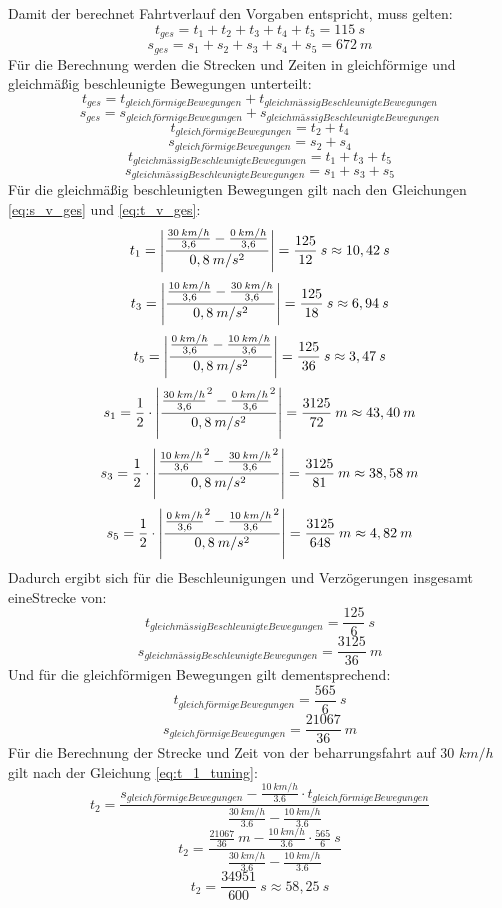 \noindent Damit der berechnet Fahrtverlauf den Vorgaben entspricht, muss gelten:
\[t_{ges} = t_1 + t_2 + t_3 + t_4 + t_5 = 115\:s\]
\[s_{ges} = s_1 + s_2 + s_3 + s_4 + s_5 = 672\:m\]
Für die Berechnung werden die Strecken und Zeiten in gleichförmige und gleichmäßig beschleunigte Bewegungen unterteilt:
\[t_{ges} = t_{gleichförmige Bewegungen} + t_{gleichmässig Beschleunigte Bewegungen}\]
\[s_{ges} = s_{gleichförmige Bewegungen} + s_{gleichmässig Beschleunigte Bewegungen}\]
\[t_{gleichförmige Bewegungen} = t_2 + t_4\]
\[s_{gleichförmige Bewegungen} = s_2 + s_4\]
\[t_{gleichmässig Beschleunigte Bewegungen} = t_1 + t_3 + t_5\]
\[s_{gleichmässig Beschleunigte Bewegungen} = s_1 + s_3 + s_5\]
Für die gleichmäßig beschleunigten Bewegungen gilt nach den Gleichungen \ref{eq:s_v_ges} und \ref{eq:t_v_ges}:
\[t_1 = \left\vert\frac{\frac{30\:km/h}{3,6}-\frac{0\:km/h}{3,6}}{0,8\:m/s^{2}}\right\vert = \frac{125}{12}\:s \approx 10,42\:s\]
\[t_3 = \left\vert\frac{\frac{10\:km/h}{3,6}-\frac{30\:km/h}{3,6}}{0,8\:m/s^{2}}\right\vert = \frac{125}{18}\:s \approx 6,94\:s\]
\[t_5 = \left\vert\frac{\frac{0\:km/h}{3,6}-\frac{10\:km/h}{3,6}}{0,8\:m/s^{2}}\right\vert = \frac{125}{36}\:s \approx 3,47\:s\]
\[s_1 = \frac{1}{2}\cdot\left\vert\frac{{\frac{30\:km/h}{3,6}}^2-{\frac{0\:km/h}{3,6}}^2}{0,8\:m/s^{2}}\right\vert = \frac{3125}{72}\:m \approx 43,40\:m\]
\[s_3 = \frac{1}{2}\cdot\left\vert\frac{{\frac{10\:km/h}{3,6}}^2-{\frac{30\:km/h}{3,6}}^2}{0,8\:m/s^{2}}\right\vert = \frac{3125}{81}\:m \approx 38,58\:m\]
\[s_5 = \frac{1}{2}\cdot\left\vert\frac{{\frac{0\:km/h}{3,6}}^2-{\frac{10\:km/h}{3,6}}^2}{0,8\:m/s^{2}}\right\vert = \frac{3125}{648}\:m \approx 4,82\:m\]
Dadurch ergibt sich für die Beschleunigungen und Verzögerungen insgesamt eine\linebreak[4]Strecke von:
\[t_{gleichmässig Beschleunigte Bewegungen} = \frac{125}{6}\:s\]
\[s_{gleichmässig Beschleunigte Bewegungen} = \frac{3125}{36}\:m\]
Und für die gleichförmigen Bewegungen gilt dementsprechend:
\[t_{gleichförmige Bewegungen} = \frac{565}{6}\:s\]
\[s_{gleichförmige Bewegungen} = \frac{21067}{36}\:m\]
Für die Berechnung der Strecke und Zeit von der \Gls{beharrungsfahrt} auf 30 $km/h$ gilt nach der Gleichung \ref{eq:t_1_tuning}:
\[t_{2} = \frac{s_{gleichförmige Bewegungen} - \frac{10\:km/h}{3.6} \cdot t_{gleichförmige Bewegungen}}{\frac{30\:km/h}{3.6} - \frac{10\:km/h}{3.6}}\]
\[t_{2} = \frac{\frac{21067}{36}\:m - \frac{10\:km/h}{3.6} \cdot \frac{565}{6}\:s}{\frac{30\:km/h}{3.6} - \frac{10\:km/h}{3.6}}\]
\[t_{2} = \frac{34951}{600}\:s \approx 58,25\:s\]
